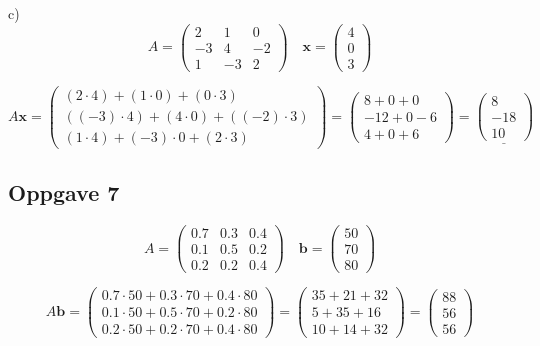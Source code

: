 \documentclass{article}
\begin{document}
c)
\[A = \begin{pmatrix}
    2 & 1 & 0 \\ -3 & 4 & -2 \\ 1 & -3 & 2
\end{pmatrix} \quad \textbf{x} = \begin{pmatrix}
    4 \\ 0 \\ 3
\end{pmatrix}\]

\[A\textbf{x} = \begin{pmatrix}
    (2 \cdot 4) + (1 \cdot 0) + (0 \cdot 3) \\ ((-3) \cdot 4) + (4 \cdot 0) + ((-2) \cdot 3) \\ (1 \cdot 4) + (-3) \cdot 0 + (2 \cdot 3)
\end{pmatrix} = \begin{pmatrix}
    8 + 0 + 0 \\ -12 + 0 - 6 \\ 4 + 0 + 6
\end{pmatrix} = \underline{\begin{pmatrix}
    8 \\ -18 \\ 10
\end{pmatrix}}\]

\newpage

\subsection*{Oppgave 7}

\[A = \begin{pmatrix}
    0.7 & 0.3 & 0.4 \\ 0.1 & 0.5 & 0.2 \\ 0.2 & 0.2 & 0.4
\end{pmatrix} \quad \textbf{b} = \begin{pmatrix}
    50 \\ 70 \\ 80
\end{pmatrix}\]

\[
    A\textbf{b} = \begin{pmatrix}
        0.7 \cdot 50 + 0.3 \cdot 70 + 0.4 \cdot 80 \\ 0.1 \cdot 50 + 0.5 \cdot 70 + 0.2 \cdot 80 \\ 0.2 \cdot 50 + 0.2 \cdot 70 + 0.4 \cdot 80
    \end{pmatrix}
    =
    \begin{pmatrix}
        35 + 21 + 32 \\ 5 + 35 + 16 \\ 10 + 14 + 32
    \end{pmatrix}
    =
    \begin{pmatrix}
        88 \\ 56 \\ 56
    \end{pmatrix}
\]
\end{document}
